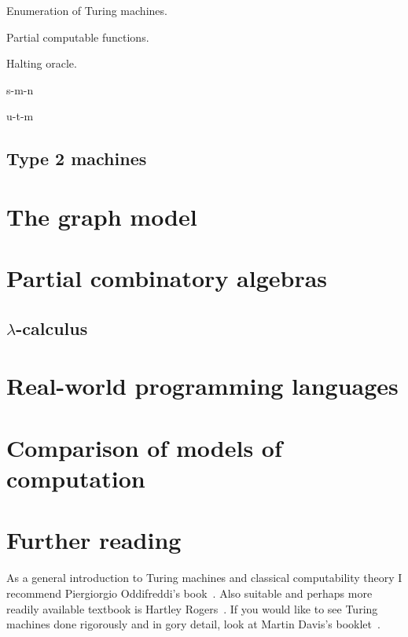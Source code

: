 Enumeration of Turing machines.

Partial computable functions.

Halting oracle.

s-m-n

u-t-m

\subsection{Type 2 machines}
\label{sec:type-2}



\section{The graph model}
\label{sec:graph-model}


\section{Partial combinatory algebras}
\label{sec:pcas}

\subsection{$\lambda$-calculus}
\label{sec:lambda-calculus}




\section{Real-world programming languages}
\label{sec:programming-languages}


\section{Comparison of models of computation}
\label{sec:models-comparison}



\section{Further reading}
\label{sec:models-further-reading}

As a general introduction to Turing machines and classical
computability theory I recommend Piergiorgio Oddifreddi's
book~\cite{Oddifreddi}. Also suitable and perhaps more readily
available textbook is Hartley Rogers~\cite{Rogers}. If you would like
to see Turing machines done rigorously and in gory detail, look at
Martin Davis's booklet~\cite{Davis}.



